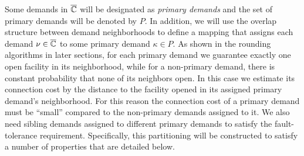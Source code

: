 \documentclass{llncs}
\begin{document}
Some demands in $\overline{\mathbb{C}}$ will be designated as
\emph{primary demands} and the set of primary demands will
be denoted by $P$. In addition, we will use the overlap
structure between demand neighborhoods to define a mapping
that assigns each demand $\nu\in\overline{\mathbb{C}}$ to some primary
demand $\kappa\in P$. As shown in the rounding algorithms in
later sections, for each primary demand we guarantee exactly
one open facility in its neighborhood, while for a
non-primary demand, there is constant probability that none
of its neighbors open. In this case we estimate its
connection cost by the distance to the facility opened in
its assigned primary demand's neighborhood. For this reason
the connection cost of a primary demand must be ``small''
compared to the non-primary demands assigned to it. We also
need sibling demands assigned to different primary demands to satisfy
the fault-tolerance requirement. Specifically, this
partitioning will be constructed to satisfy a number of
properties that are detailed below.
%
\end{document}
